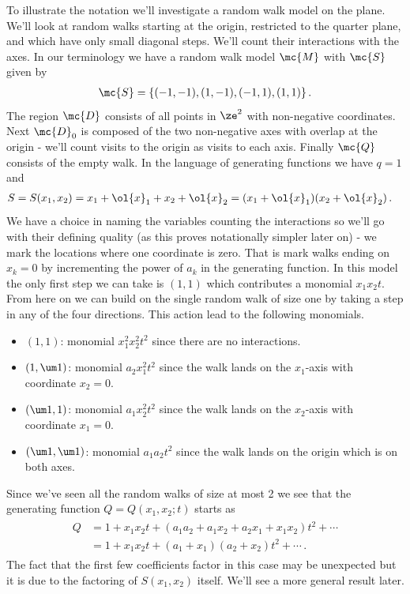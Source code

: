 \begin{example} To illustrate the notation we'll investigate a random walk model on the plane. We'll look at random walks starting at the origin, restricted to the quarter plane, and which have only small diagonal steps. We'll count their interactions with the axes. In our terminology we have a random walk model $\mc{M}$ with $\mc{S}$ given by
\begin{align}
	\mc{S} = \{(-1,-1),(1,-1),(-1,1),(1,1)\}\,.
\end{align}
The region $\mc{D}$ consists of all points in $\ze^2$ with non-negative coordinates. Next $\mc{D}_0$ is composed of the two non-negative axes with overlap at the origin - we'll count visits to the origin as visits to each axis. Finally $\mc{Q}$ consists of the empty walk. In the language of generating functions we have $q = 1$ and
\begin{align}
	S &= S(x_1,x_2)  = x_1+\ol{x}_1+x_2+\ol{x}_2 = (x_1+\ol{x}_1)(x_2 + \ol{x}_2)\,.
\end{align}
We have a choice in naming the variables counting the interactions so we'll go with their defining quality (as this proves notationally simpler later on) - we mark the locations where one coordinate is zero. That is mark walks ending on $x_k = 0$ by incrementing the power of $a_k$ in the generating function. In this model the only first step we can take is $(1,1)$ which contributes a monomial $x_1x_2t$. From here on we can build on the single random walk of size one by taking a step in any of the four directions. This action lead to the following monomials.
\begin{itemize}
	\item $(1,1)$: monomial $x_1^2x_2^2 t^2$ since there are no interactions.
	\item $(1,\um1)$: monomial  $a_2x_1^2t^2$ since the walk lands on the $x_1$-axis with coordinate $x_2 = 0$.
	\item $(\um 1,1)$: monomial  $a_1x_2^2 t^2$ since the walk lands on the $x_2$-axis with coordinate $x_1 = 0$.
	\item $(\um1,\um1)$: monomial  $a_1a_2 t^2$ since the walk lands on the origin which is on both axes.
\end{itemize}
Since we've seen all the random walks of size at most 2 we see that the generating function $Q = Q(x_1,x_2;t)$ starts as
\begin{align}
\begin{split}
	Q  &=  1 + x_1x_2 t + (a_1a_2 + a_1x_2+a_2x_1 +x_1x_2)t^2 + \cdots\\
	& = 1 + x_1x_2 t+ (a_1+x_1)(a_2+x_2)t^2 + \cdots\,.
\end{split}
\end{align}
The fact that the first few coefficients factor in this case may be unexpected but it is due to the factoring of $S(x_1,x_2)$ itself. We'll see a more general result later.
\end{example}

